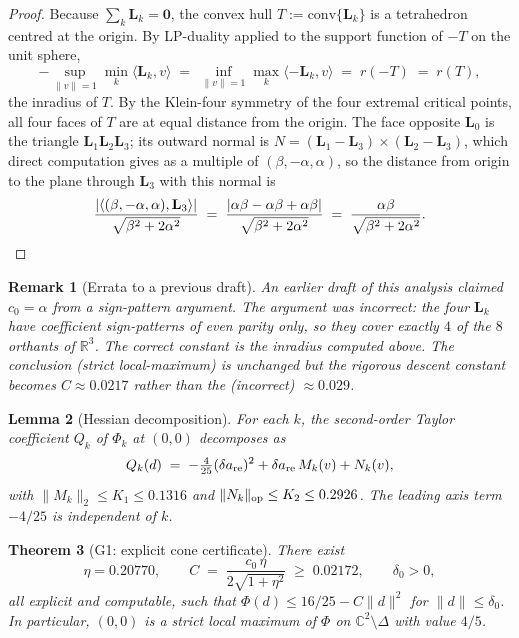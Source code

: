 \documentclass[11pt,a4paper]{article}
\newtheorem{theorem}{Theorem}[section]
\newtheorem{lemma}[theorem]{Lemma}
\newtheorem{remark}[theorem]{Remark}
\begin{document}
\begin{proof}
Because $\sum_k\mathbf L_k=\mathbf 0$, the convex hull $T :=
\mathrm{conv}\{\mathbf L_k\}$ is a tetrahedron centred at the origin.
By LP-duality applied to the support function of $-T$ on the unit
sphere,
\[
-\sup_{\|v\|=1}\min_k\langle\mathbf L_k,v\rangle
\;=\;
\inf_{\|v\|=1}\max_k\langle-\mathbf L_k,v\rangle
\;=\;
r(-T) \;=\; r(T),
\]
the inradius of $T$. By the Klein-four symmetry of the four extremal
critical points, all four faces of $T$ are at equal distance from the
origin. The face opposite $\mathbf L_0$ is the triangle
$\mathbf L_1\mathbf L_2\mathbf L_3$; its outward normal is
$N=(\mathbf L_1-\mathbf L_3)\times(\mathbf L_2-\mathbf L_3)$, which
direct computation gives as a multiple of $(\beta,-\alpha,\alpha)$, so
the distance from origin to the plane through $\mathbf L_3$ with this
normal is
\[
\frac{|\langle(\beta,-\alpha,\alpha),\mathbf L_3\rangle|}{\sqrt{\beta^2+2\alpha^2}}
\;=\;\frac{|\alpha\beta-\alpha\beta+\alpha\beta|}{\sqrt{\beta^2+2\alpha^2}}
\;=\;\frac{\alpha\beta}{\sqrt{\beta^2+2\alpha^2}}.\qedhere
\]
\end{proof}

\begin{remark}[Errata to a previous draft]
An earlier draft of this analysis claimed $c_0=\alpha$ from a
sign-pattern argument. The argument was incorrect: the four $\mathbf
L_k$ have coefficient sign-patterns of even parity only, so they cover
exactly $4$ of the $8$ orthants of $\mathbb{R}^3$. The correct
constant is the inradius computed above. The conclusion (strict
local-maximum) is unchanged but the rigorous descent constant becomes
$C\approx 0.0217$ rather than the (incorrect) $\approx 0.029$.
\end{remark}

\begin{lemma}[Hessian decomposition]\label{lem:Q-decomp}
For each $k$, the second-order Taylor coefficient $Q_k$ of $\Phi_k$ at
$(0,0)$ decomposes as
\begin{equation}
Q_k(d) \;=\; -\tfrac{4}{25}(\delta a_{\rm re})^2
        + \delta a_{\rm re}\,M_k(v)
        + N_k(v),
\end{equation}
with $\|M_k\|_2\le K_1\le 0.1316$ and $\|N_k\|_{\rm op}\le K_2\le 0.2926$.
The leading axis term $-4/25$ is independent of $k$.
\end{lemma}

\begin{theorem}[G1: explicit cone certificate]\label{thm:G1}
There exist
\begin{equation}
\eta = 0.20770,
\qquad
C \;=\; \frac{c_0\,\eta}{2\sqrt{1+\eta^2}}\;\ge\; 0.02172,
\qquad
\delta_0 > 0,
\end{equation}
all explicit and computable, such that
$\Phi(d)\le 16/25 - C\|d\|^2$ for $\|d\|\le\delta_0$.
In particular, $(0,0)$ is a strict local maximum of $\Phi$ on
$\mathbb{C}^2\setminus\Delta$ with value $4/5$.
\end{theorem}
\end{document}
